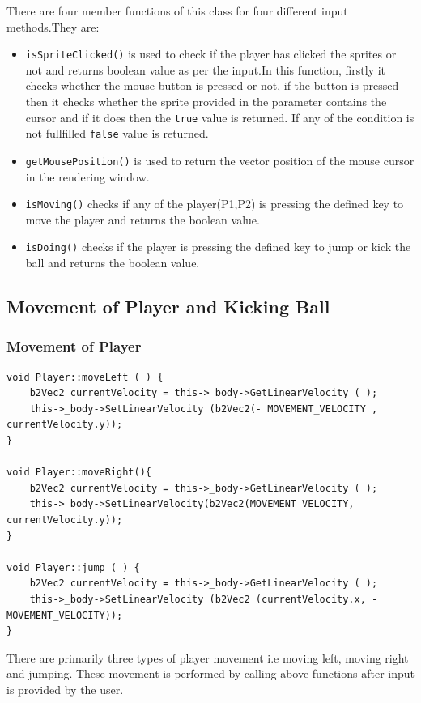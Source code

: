 \documentclass[main]{subfiles}
\begin{document}
There are four member functions of this class for four different input methods.They are:
\begin{itemize}
    \item\texttt{isSpriteClicked()} is used to check if the player has clicked the sprites or not and returns boolean value as per the input.In this function, firstly it checks whether the mouse button is pressed or not, if the button is pressed then it checks whether the sprite provided in the parameter contains the cursor and if it does then the \texttt{true} value is returned. If any of the condition is not fullfilled \texttt{false} value is returned.
    \item\texttt{getMousePosition()} is used to return the vector position of the mouse cursor in the rendering window.
    \item\texttt{isMoving()} checks if any of the player(P1,P2) is pressing the defined key to move the player and returns the boolean value.
    \item\texttt{isDoing()} checks if the player is pressing the defined key to jump or kick the ball and returns the boolean value.
\end{itemize}


\subsection{Movement of Player and Kicking Ball}
\subsubsection{Movement of Player}
\begin{verbatim}
void Player::moveLeft ( ) {
    b2Vec2 currentVelocity = this->_body->GetLinearVelocity ( );
    this->_body->SetLinearVelocity (b2Vec2(- MOVEMENT_VELOCITY , currentVelocity.y));
}
     
void Player::moveRight(){
    b2Vec2 currentVelocity = this->_body->GetLinearVelocity ( );
    this->_body->SetLinearVelocity(b2Vec2(MOVEMENT_VELOCITY, currentVelocity.y));
}
    
void Player::jump ( ) {
    b2Vec2 currentVelocity = this->_body->GetLinearVelocity ( );
    this->_body->SetLinearVelocity (b2Vec2 (currentVelocity.x, - MOVEMENT_VELOCITY));
}
\end{verbatim}
There are primarily three types of player movement i.e moving left, moving right and jumping. These movement is performed by calling above functions after input is provided by the user. 
\end{document}
